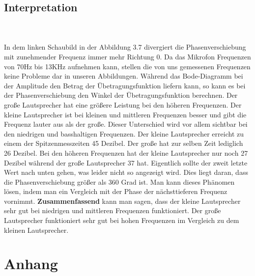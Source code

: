 \documentclass[12pt, oneside, a4paper, \docLanguage]{report}
\begin{document}
\newpage
\section{Interpretation}
\label{chap:VERSUCH_2_INTERPRETATION}
\\~\\
In dem linken Schaubild in der Abbildung 3.7 divergiert die Phasenverschiebung mit zunehmender Frequenz immer mehr Richtung 0.
\newline
Da das Mikrofon Frequenzen von 70Hz bis 13KHz aufnehmen kann, stellen die von uns gemessenen Frequenzen keine Probleme dar in unseren Abbildungen.
\newline
Während das Bode-Diagramm bei der Amplitude den Betrag der Übetragungsfunktion liefern kann, so kann es bei der Phasenverschiebung den Winkel der Übetragungsfunktion berechnen.
\newline
Der große Lautsprecher hat eine größere Leistung bei den höheren Frequenzen. Der kleine Lautsprecher ist bei kleinen und mittleren Frequenzen besser und gibt die Frequenz lauter aus als der große.
\newline
Dieser Unterschied wird vor allem sichtbar bei den niedrigen und basshaltigen Frequenzen.
Der kleine Lautsprecher erreicht zu einem der Spitzenmesszeiten 45 Dezibel.
\newline
Der große hat zur selben Zeit lediglich 26 Dezibel.
Bei den höheren Frequenzen hat der kleine Lautsprecher nur noch 27 Dezibel während der große Lautsprecher 37 hat.
\newline
\newline 
Eigentlich sollte der zweit letzte Wert nach unten gehen, was leider nicht so angezeigt wird. Dies liegt daran, dass die Phasenverschiebung größer als 360 Grad ist.
Man kann dieses Phänomen lösen, indem man ein Vergleich mit der Phase der nächsttieferen Frequenz vornimmt.
\newline
\newline
\textbf{Zusammenfassend} kann man sagen, dass der kleine Lautsprecher sehr gut bei niedrigen und mittleren Frequenzen funktioniert.
\newline
Der große Lautsprecher funktioniert sehr gut bei hohen Frequenzen im Vergleich zu dem kleinen Lautsprecher.
%
%
\renewcommand\thesection{A.\arabic{section}}
\renewcommand\thesubsection{\thesection.\arabic{subsection}}

\chapter*{Anhang}
\label{chap:APPENDIX}
\addtocounter{chapter}{1}
\setcounter{section}{0}
\end{document}
